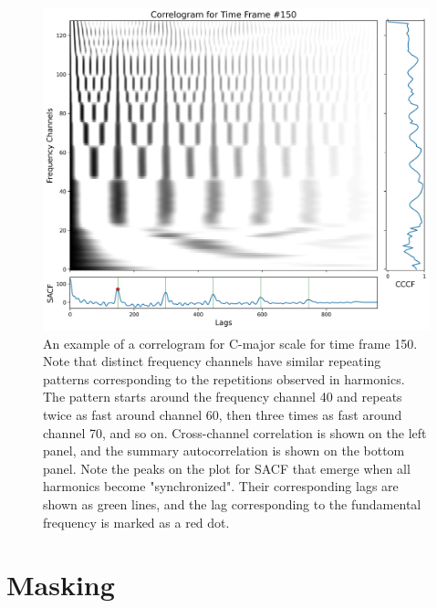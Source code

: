 \begin{figure}[t]
	\centering
	\includegraphics[width=\textwidth]{include/correlogram_example}
	\caption[An example of correlogram and the extracted features for C-major scale]{An example of a correlogram for C-major scale for time frame 150. Note that distinct frequency channels have similar repeating patterns corresponding to the repetitions observed in harmonics. The pattern starts around the frequency channel 40 and repeats twice as fast around channel 60, then three times as fast around channel 70, and so on. Cross-channel correlation is shown on the left panel, and the summary autocorrelation is shown on the bottom panel. Note the peaks on the plot for SACF that emerge when all harmonics become "synchronized". Their corresponding lags are shown as green lines, and the lag corresponding to the fundamental frequency is marked as a red dot.}
	\label{img:correlogram_example}
\end{figure}

\section{Masking}



